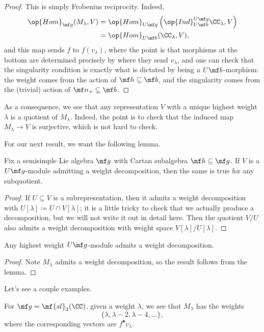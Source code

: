 \documentclass[../notes.tex]{subfiles}
\begin{document}
\begin{proof}
	This is simply Frobenius reciprocity. Indeed,
	\begin{align*}
		\op{Hom}_{\mf g}(M_\lambda,V) &= \op{Hom}_{U\mf g}\left(\op{Ind}_{U\mf b}^{U\mf g}\CC_\lambda,V\right) \\
		&= \op{Hom}_{U\mf b}(\CC_\lambda,V),
	\end{align*}
	and this map sends $f$ to $f(v_\lambda)$, where the point is that morphisms at the bottom are determined precisely by where they send $v_\lambda$, and one can check that the singularity condition is exactly what is dictated by being a $U\mf b$-morphism: the weight comes from the action of $\mf h\subseteq\mf b$, and the singularity comes from the (trivial) action of $\mf n_+\subseteq\mf b$.
\end{proof}
\begin{remark}
	As a consequence, we see that any representation $V$ with a unique highest weight $\lambda$ is a quotient of $M_\lambda$. Indeed, the point is to check that the induced map $M_\lambda\to V$ is surjective, which is not hard to check.
\end{remark}
For our next result, we want the following lemma.
\begin{lemma}
	Fix a semisimple Lie algebra $\mf g$ with Cartan subalgebra $\mf h\subseteq\mf g$. If $V$ is a $U\mf g$-module admitting a weight decomposition, then the same is true for any subquotient.
\end{lemma}
\begin{proof}
	If $U\subseteq V$ is a subrepresentation, then it admits a weight decomposition with $U[\lambda]\coloneqq U\cap V[\lambda]$; it is a little tricky to check that we actually produce a decomposition, but we will not write it out in detail here. Then the quotient $V/U$ also admits a weight decomposition with weight space $V[\lambda]/U[\lambda]$.
\end{proof}
\begin{corollary}
	Any highest weight $U\mf g$-module admits a weight decomposition.
\end{corollary}
\begin{proof}
	Note $M_\lambda$ admits a weight decomposition, so the result follows from the lemma.
\end{proof}
Let's see a couple examples.
\begin{example}
	For $\mf g=\mf{sl}_2(\CC)$, given a weight $\lambda$, we see that $M_\lambda$ has the weights
	\[\{\lambda,\lambda-2,\lambda-4,\ldots\},\]
	where the corresponding vectors are $f^\bullet v_\lambda$.
\end{example}
\end{document}
